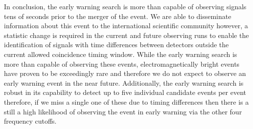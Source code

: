 In conclusion, the early warning search is more than capable of observing \gwadj signals tens of seconds prior to the merger of the \gwadj event. We are able to disseminate information about this event to the international scientific community however, a statistic change is required in the current and future observing runs to enable the identification of \gwadj signals with time differences between detectors outside the current allowed coincidence timing window. While the early warning search is more than capable of observing these events, electromagnetically bright events have proven to be exceedingly rare and therefore we do not expect to observe an early warning event in the near future. Additionally, the early warning search is robust in its capability to detect up to five individual candidate events per \gwadj event therefore, if we miss a single one of these due to timing differences then there is a still a high likelihood of observing the \gwadj event in early warning via the other four frequency cutoffs.
